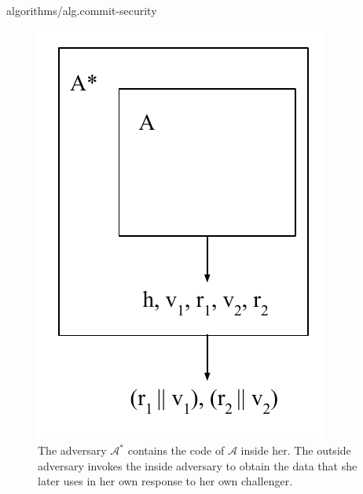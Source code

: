 {algorithms/alg.commit-security}

\begin{figure}[h]
    \centering
    \includegraphics[width=0.35 \columnwidth,keepaspectratio]{figures/hash-commitment-reduction.pdf}
    \caption{The adversary $\mathcal{A}^*$ contains the code of $\mathcal{A}$ inside her. The outside
             adversary invokes the inside adversary to obtain the data that she later uses in her own
             response to her own challenger.}
    \label{fig.hash-commitment-reduction}
\end{figure}


